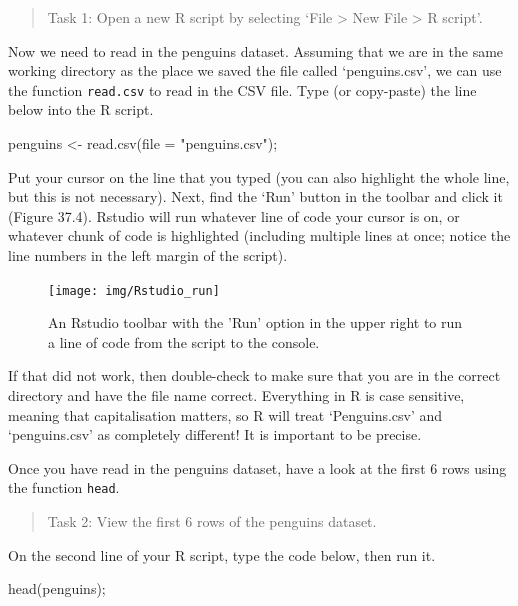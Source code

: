 \documentclass[
]{scrbook}
\newenvironment{Shaded}{\begin{snugshade}}{\end{snugshade}}
\newcommand{\AttributeTok}[1]{\textcolor[rgb]{0.77,0.63,0.00}{#1}}
\newcommand{\FunctionTok}[1]{\textcolor[rgb]{0.00,0.00,0.00}{#1}}
\newcommand{\NormalTok}[1]{#1}
\newcommand{\OtherTok}[1]{\textcolor[rgb]{0.56,0.35,0.01}{#1}}
\newcommand{\StringTok}[1]{\textcolor[rgb]{0.31,0.60,0.02}{#1}}
\begin{document}
\begin{quote}
Task 1: Open a new R script by selecting `File \textgreater{} New File \textgreater{} R script'.
\end{quote}

Now we need to read in the penguins dataset.
Assuming that we are in the same working directory as the place we saved the file called `penguins.csv', we can use the function \texttt{read.csv} to read in the CSV file.
Type (or copy-paste) the line below into the R script.

\begin{Shaded}
\begin{Highlighting}[]
\NormalTok{penguins }\OtherTok{\textless{}{-}} \FunctionTok{read.csv}\NormalTok{(}\AttributeTok{file =} \StringTok{"penguins.csv"}\NormalTok{);}
\end{Highlighting}
\end{Shaded}

Put your cursor on the line that you typed (you can also highlight the whole line, but this is not necessary).
Next, find the `Run' button in the toolbar and click it (Figure 37.4).
Rstudio will run whatever line of code your cursor is on, or whatever chunk of code is highlighted (including multiple lines at once; notice the line numbers in the left margin of the script).

\begin{figure}
\texttt{[image: img/Rstudio\_run]} \caption{An Rstudio toolbar with the 'Run' option in the upper right to run a line of code from the script to the console.}\label{fig:unnamed-chunk-223}
\end{figure}

If that did not work, then double-check to make sure that you are in the correct directory and have the file name correct.
Everything in R is case sensitive, meaning that capitalisation matters, so R will treat `Penguins.csv' and `penguins.csv' as completely different!
It is important to be precise.

Once you have read in the penguins dataset, have a look at the first 6 rows using the function \texttt{head}.

\begin{quote}
Task 2: View the first 6 rows of the penguins dataset.
\end{quote}

On the second line of your R script, type the code below, then run it.

\begin{Shaded}
\begin{Highlighting}[]
\FunctionTok{head}\NormalTok{(penguins);}
\end{Highlighting}
\end{Shaded}
\end{document}
